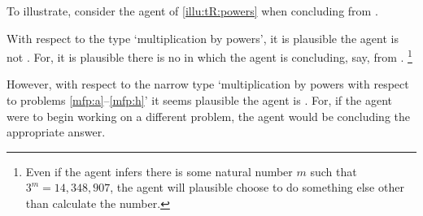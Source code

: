 \begin{note}
  To illustrate, consider the agent of \autoref{illu:tR:powers} when concluding  from .

  With respect to the type `multiplication by powers', it is plausible the agent is not \ptCV{}.
  For, it is plausible there is no \pevent{} in which the agent is concluding, say,  from .%
  \footnote{
    Even if the agent infers there is some natural number \(m\) such that \(3^{m} = 14,348,907\), the agent will plausible choose to do something else other than calculate the number.
  }

  However, with respect to the narrow type `multiplication by powers with respect to problems \ref{mfp:a}--\ref{mfp:h}' it seems plausible the agent is \ptCV{}.
  For, if the agent were to begin working on a different problem, the agent would be concluding the appropriate answer.
\end{note}

